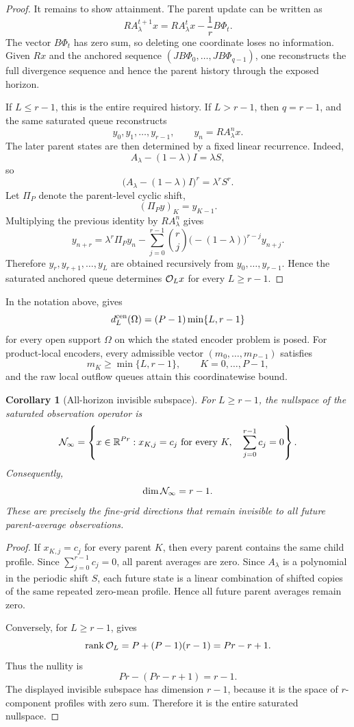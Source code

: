\documentclass[preprint,12pt]{elsarticle}
\theoremstyle{plain}
\newtheorem{corollary}{Corollary}
\theoremstyle{remark}
\theoremstyle{definition}
\DeclareMathOperator{\rank}{rank}
\begin{document}
\begin{proof}
It remains to show attainment.  The parent update can be written as
\[
  RA_\lambda^{t+1}x
  =
  RA_\lambda^t x
  -
  \frac1r B\Phi_t .
\]
The vector \(B\Phi_t\) has zero sum, so deleting one coordinate loses no
information.  Given \(Rx\) and the anchored sequence
\((JB\Phi_0,\ldots,JB\Phi_{q-1})\), one reconstructs the full divergence
sequence and hence the parent history through the exposed horizon.

If \(L\le r-1\), this is the entire required history.  If \(L>r-1\), then
\(q=r-1\), and the same saturated queue reconstructs
\[
  y_0,y_1,\ldots,y_{r-1},
  \qquad
  y_n=RA_\lambda^n x.
\]
The later parent states are then determined by a fixed linear recurrence.
Indeed,
\[
  A_\lambda-(1-\lambda)I=\lambda S,
\]
so
\[
  \bigl(A_\lambda-(1-\lambda)I\bigr)^r
  =
  \lambda^r S^r.
\]
Let \(\Pi_P\) denote the parent-level cyclic shift,
\[
  (\Pi_P y)_K=y_{K-1}.
\]
Multiplying the previous identity by \(RA_\lambda^n\) gives
\[
  y_{n+r}
  =
  \lambda^r \Pi_P y_n
  -
  \sum_{j=0}^{r-1}
  \binom{r}{j}
  \bigl(-(1-\lambda)\bigr)^{r-j}
  y_{n+j}.
\]
Therefore \(y_r,y_{r+1},\ldots,y_L\) are obtained recursively from
\(y_0,\ldots,y_{r-1}\).  Hence the saturated anchored queue determines
\({\cal O}_Lx\) for every \(L\ge r-1\).
\end{proof}
In the notation above,  gives
\[
  d^{\rm cen}_L(\Omega)
  =
  (P-1)\min\{L,r-1\}
\]
for every open support \(\Omega\) on which the stated encoder problem is
posed.  For product-local encoders, every admissible vector
\((m_0,\ldots,m_{P-1})\) satisfies
\[
  m_K\ge \min\{L,r-1\},
  \qquad K=0,\ldots,P-1,
\]
and the raw local outflow queues attain this coordinatewise bound.

\begin{corollary}[All-horizon invisible subspace]
\label{cor:invisible-subspace}
For \(L\ge r-1\), the nullspace of the saturated observation operator is
\[
  {\cal N}_{\infty}
  =
  \left\{
  x\in\mathbb R^{Pr}:
  x_{K,j}=c_j\ \text{for every }K,\quad
  \sum_{j=0}^{r-1}c_j=0
  \right\}.
\]
Consequently,
\[
  \dim {\cal N}_{\infty}=r-1.
\]
These are precisely the fine-grid directions that remain invisible to all
future parent-average observations.
\end{corollary}

\begin{proof}
If \(x_{K,j}=c_j\) for every parent \(K\), then every parent contains the
same child profile.  Since \(\sum_{j=0}^{r-1}c_j=0\), all parent averages are
zero.  Since \(A_\lambda\) is a polynomial in the periodic shift \(S\), each
future state is a linear combination of shifted copies of the same repeated
zero-mean profile.  Hence all future parent averages remain zero.

Conversely, for \(L\ge r-1\),  gives
\[
  \rank {\cal O}_L
  =
  P+(P-1)(r-1)
  =
  Pr-r+1.
\]
Thus the nullity is
\[
  Pr-(Pr-r+1)=r-1.
\]
The displayed invisible subspace has dimension \(r-1\), because it is the
space of \(r\)-component profiles with zero sum.  Therefore it is the entire
saturated nullspace.
\end{proof}
\end{document}
